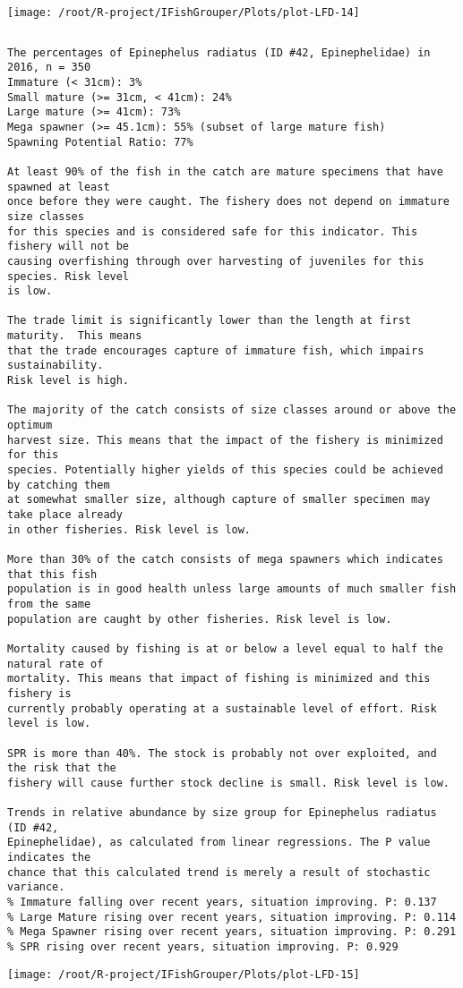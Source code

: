 \documentclass{report}\usepackage[]{graphicx}\usepackage[]{color}
\makeatletter
\def\maxwidth{ %
  \ifdim\Gin@nat@width>\linewidth
    \linewidth
  \else
    \Gin@nat@width
  \fi
}
\newenvironment{kframe}{%
 \def\at@end@of@kframe{}%
 \ifinner\ifhmode%
  \def\at@end@of@kframe{\end{minipage}}%
  \begin{minipage}{\columnwidth}%
 \fi\fi%
 \def\FrameCommand##1{\hskip\@totalleftmargin \hskip-\fboxsep
 \colorbox{shadecolor}{##1}\hskip-\fboxsep
     \hskip-\linewidth \hskip-\@totalleftmargin \hskip\columnwidth}%
 \MakeFramed {\advance\hsize-\width
   \@totalleftmargin\z@ \linewidth\hsize
   \@setminipage}}%
 {\par\unskip\endMakeFramed%
 \at@end@of@kframe}
\newenvironment{knitrout}{}{} %
\makeatother
\begin{document}
\begin{knitrout}
\texttt{[image: /root/R-project/IFishGrouper/Plots/plot-LFD-14]} 
\begin{kframe}\begin{verbatim}
\end{verbatim}
\end{kframe}
\clearpage
\newpage
\begin{kframe}\begin{verbatim}The percentages of Epinephelus radiatus (ID #42, Epinephelidae) in 2016, n = 350
Immature (< 31cm): 3%
Small mature (>= 31cm, < 41cm): 24%
Large mature (>= 41cm): 73%
Mega spawner (>= 45.1cm): 55% (subset of large mature fish)
Spawning Potential Ratio: 77%
 
At least 90% of the fish in the catch are mature specimens that have spawned at least
once before they were caught. The fishery does not depend on immature size classes
for this species and is considered safe for this indicator. This fishery will not be
causing overfishing through over harvesting of juveniles for this species. Risk level
is low.

The trade limit is significantly lower than the length at first maturity.  This means
that the trade encourages capture of immature fish, which impairs sustainability.
Risk level is high.

The majority of the catch consists of size classes around or above the optimum
harvest size. This means that the impact of the fishery is minimized for this
species. Potentially higher yields of this species could be achieved by catching them
at somewhat smaller size, although capture of smaller specimen may take place already
in other fisheries. Risk level is low.

More than 30% of the catch consists of mega spawners which indicates that this fish
population is in good health unless large amounts of much smaller fish from the same
population are caught by other fisheries. Risk level is low.
 
Mortality caused by fishing is at or below a level equal to half the natural rate of
mortality. This means that impact of fishing is minimized and this fishery is
currently probably operating at a sustainable level of effort. Risk level is low.
 
SPR is more than 40%. The stock is probably not over exploited, and the risk that the
fishery will cause further stock decline is small. Risk level is low.
 
Trends in relative abundance by size group for Epinephelus radiatus (ID #42,
Epinephelidae), as calculated from linear regressions. The P value indicates the
chance that this calculated trend is merely a result of stochastic variance.
% Immature falling over recent years, situation improving. P: 0.137
% Large Mature rising over recent years, situation improving. P: 0.114
% Mega Spawner rising over recent years, situation improving. P: 0.291
% SPR rising over recent years, situation improving. P: 0.929
\end{verbatim}
\end{kframe}
\texttt{[image: /root/R-project/IFishGrouper/Plots/plot-LFD-15]} 


\end{knitrout}
\end{document}
